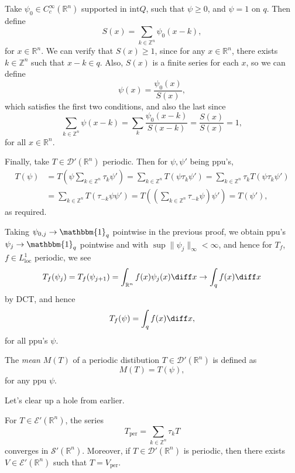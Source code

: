 \documentclass[12pt]{article}
\begin{document}
\begin{proofbox}
	Take $\psi_0 \in C^\infty_c(\mathbb{R}^n)$ supported in $\mathrm{int} Q$, such that $\psi \geq 0$, and $\psi = 1$ on $q$. Then define
	\[
	S(x) = \sum_{k \in \mathbb{Z}^n}\psi_0(x - k),
	\]
	for $x \in \mathbb{R}^n$. We can verify that $S(x) \geq 1$, since for any $x \in \mathbb{R}^n$, there exists $k \in \mathbb{Z}^n$ such that $x - k \in q$. Also, $S(x)$ is a finite series for each $x$, so we can define
	\[
	\psi(x) = \frac{\psi_0(x)}{S(x)},
	\]
	which satisfies the first two conditions, and also the last since
	\[
	\sum_{k \in \mathbb{Z}^n} \psi(x - k) = \sum_k \frac{\psi_0(x - k)}{S(x - k)} = \frac{S(x)}{S(x)} = 1,
	\]
	for all $x \in \mathbb{R}^n$.

	Finally, take $T \in \mathcal{D}'(\mathbb{R}^n)$ periodic. Then for $\psi, \psi'$ being ppu's,
	\begin{align*}
		T(\psi) &= T \left( \psi \sum_{k \in \mathbb{Z}^n} \tau_k \psi' \right) = \sum_{k \in \mathbb{Z}^n} T \left( \psi \tau_k \psi'\right) = \sum_{k \in \mathbb{Z}^n} \tau_k T(\psi \tau_k \psi') \\
			&= \sum_{k \in \mathbb{Z}^n} T(\tau_{-k} \psi \psi') = T \left( \left( \sum_{k \in \mathbb{Z}^n} \tau_{-k} \psi \right) \psi' \right) = T(\psi'),
	\end{align*}
	as required.
\end{proofbox}
Taking $\psi_{0, j} \to \mathbbm{1}_{q}$ pointwise in the previous proof, we obtain ppu's $\psi_j \to \mathbbm{1}_{q}$ pointwise and with $\sup \|\psi_j\|_{\infty} < \infty$, and hence for $T_f$, $f \in L^1_{\mathrm{loc}}$ periodic, we see
\[
	T_f(\psi_j) = T_f(\psi_{j+1}) = \int_{\mathbb{R}^n} f(x) \psi_j(x) \diff x \to \int_q f(x) \diff x
\]
by DCT, and hence
\[
T_f(\psi) = \int_q f(x) \diff x,
\]
for all ppu's $\psi$.

\begin{definition}
	The \emph{mean} $M(T)$ of a periodic distibution $T \in \mathcal{D}'(\mathbb{R}^n)$ is defined as
	\[
	M(T) = T(\psi),
	\]
	for any ppu $\psi$.
\end{definition}

Let's clear up a hole from earlier.

\begin{theorem}
	For $T \in \mathcal{E}'(\mathbb{R}^n)$, the series
	\[
	T_{\mathrm{per}} = \sum_{k \in \mathbb{Z}^n} \tau_k T
	\]
	converges in $\mathcal{S}'(\mathbb{R}^n)$. Moreover, if $T \in \mathcal{D}'(\mathbb{R}^n)$ is periodic, then there exists $V \in \mathcal{E}'(\mathbb{R}^n)$ such that $T = V_{\mathrm{per}}$.
\end{theorem}
\end{document}
